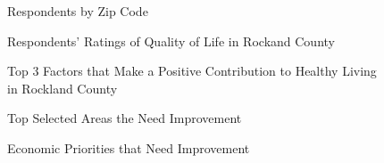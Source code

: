 \documentclass[
  english,
  letterpaper,
]{report}
\begin{document}
\begin{figure}


\caption{\label{fig-resp-zip}Respondents by Zip Code}

\end{figure}%

\begin{figure}


\caption{\label{fig-resp-qol-rc}Respondents' Ratings of Quality of Life
in Rockand County}

\end{figure}%

\begin{figure}


\caption{\label{fig-t3-pos-rc}Top 3 Factors that Make a Positive
Contribution to Healthy Living in Rockland County}

\end{figure}%

\begin{figure}


\caption{\label{fig-top-need-improve}Top Selected Areas the Need
Improvement}

\end{figure}%

\begin{figure}


\caption{\label{fig-econ-need-improve}Economic Priorities that Need
Improvement}

\end{figure}%
\end{document}
